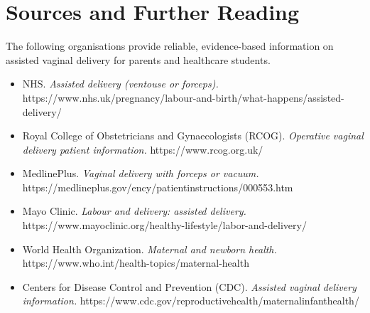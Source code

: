 \section*{Sources and Further Reading}
The following organisations provide reliable, evidence-based information on assisted vaginal delivery for parents and healthcare students.

\begin{itemize}
    \item NHS. \textit{Assisted delivery (ventouse or forceps).} https://www.nhs.uk/pregnancy/labour-and-birth/what-happens/assisted-delivery/
    \item Royal College of Obstetricians and Gynaecologists (RCOG). \textit{Operative vaginal delivery patient information.} https://www.rcog.org.uk/
    \item MedlinePlus. \textit{Vaginal delivery with forceps or vacuum.} https://medlineplus.gov/ency/patientinstructions/000553.htm
    \item Mayo Clinic. \textit{Labour and delivery: assisted delivery.} https://www.mayoclinic.org/healthy-lifestyle/labor-and-delivery/
    \item World Health Organization. \textit{Maternal and newborn health.} https://www.who.int/health-topics/maternal-health
    \item Centers for Disease Control and Prevention (CDC). \textit{Assisted vaginal delivery information.} https://www.cdc.gov/reproductivehealth/maternalinfanthealth/
\end{itemize}
